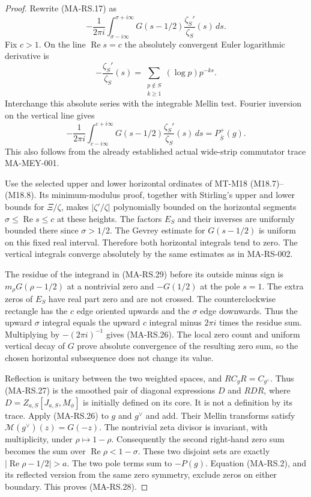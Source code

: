 \begin{proof}
Rewrite (MA-RS.17) as
\[
    -\frac1{2\pi i}\int_{\sigma-i\infty}^{\sigma+i\infty}
           G(s-1/2)\frac{\zeta_S'}{\zeta_S}(s)\,ds .
 \tag{MA-RS.29}
\]
Fix $c>1$.  On the line $\operatorname{Re}s=c$ the
absolutely convergent Euler logarithmic derivative is
\[
          -\frac{\zeta_S'}{\zeta_S}(s)
           =\sum_{\substack{p\notin S\\k\ge1}}
                              (\log p)p^{-ks}.
 \tag{MA-RS.30}
\]
Interchange this absolute series with the integrable
Mellin test.  Fourier inversion on the vertical line
gives
\[
 -\frac1{2\pi i}\int_{c-i\infty}^{c+i\infty}
        G(s-1/2)\frac{\zeta_S'}{\zeta_S}(s)\,ds
                      =P_{\overline S}^{+}(g).
 \tag{MA-RS.31}
\]
This also follows from the already established actual
wide-strip commutator trace MA-MEY-001.

Use the selected upper and lower horizontal ordinates
of MT-M18 (M18.7)--(M18.8).
Its minimum-modulus proof, together with Stirling's
upper and lower bounds for $\Xi/\zeta$, makes
$|\zeta'/\zeta|$ polynomially bounded on the horizontal
segments $\sigma\le\operatorname{Re}s\le c$ at these
heights.  The factors $E_S$ and their inverses are
uniformly bounded there since $\sigma>1/2$.
The Gevrey estimate for $G(s-1/2)$ is uniform on this
fixed real interval.  Therefore both horizontal
integrals tend to zero.  The vertical integrals
converge absolutely by the same estimates as in
MA-RS-002.

The residue of the integrand in (MA-RS.29) before
its outside minus sign is $m_\rho G(\rho-1/2)$
at a nontrivial zero and $-G(1/2)$ at the pole $s=1$.
The extra zeros of $E_S$ have real part zero and
are not crossed.  The counterclockwise rectangle
has the $c$ edge oriented upwards and the $\sigma$
edge downwards.  Thus the upward $\sigma$ integral
equals the upward $c$ integral minus $2\pi i$
times the residue sum.  Multiplying by
$-(2\pi i)^{-1}$ gives (MA-RS.26).
The local zero count and uniform vertical decay
of $G$ prove absolute convergence of the resulting
zero sum, so the chosen horizontal subsequence
does not change its value.

Reflection is unitary between the two weighted
spaces, and $RC_gR=C_{g^\vee}$.
Thus (MA-RS.27) is the smoothed pair of diagonal
expressions $D$ and $RDR$, where
$D=Z_{a,S}[J_{a,S},M_\phi]$ is initially defined
on its core.  It is not a definition by its trace.
Apply (MA-RS.26) to $g$ and $g^\vee$ and add.
Their Mellin transforms satisfy
$\mathcal M(g^\vee)(z)=G(-z)$.
The nontrivial zeta divisor is invariant, with
multiplicity, under $\rho\mapsto1-\rho$.
Consequently the second right-hand zero sum becomes
the sum over $\operatorname{Re}\rho<1-\sigma$.
These two disjoint sets are exactly
$|\operatorname{Re}\rho-1/2|>a$.
The two pole terms sum to $-P(g)$.
Equation (MA-RS.2), and its reflected version from
the same zero symmetry, exclude zeros on either
boundary.  This proves (MA-RS.28).
\end{proof}

